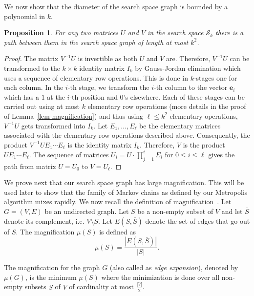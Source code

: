 \documentclass{sig-alternate-2013}
\newtheorem{proposition}[theorem]{Proposition}
\begin{document}
We now show that the diameter of the search space graph is bounded by
a polynomial in $k$.


\begin{proposition}\label{prop-path}
  For any two matrices $U$ and $V$ in the search space $\mathcal{S}_k$
  there is a path between them in the search space graph of length at
  most $k^2$.
\end{proposition}
\begin{proof}
  The matrix $V^{-1}U$ is invertible as both $U$ and $V$
  are. Therefore, $V^{-1}U$ can be transformed to the $k\times k$
  identity matrix $I_k$ by Gauss-Jordan elimination which uses a
  sequence of elementary row operations. This is done in $k$-stages
  one for each column. In the $i$-th stage, we transform the $i$-th
  column to the vector $\mathbf{e}_i$ which has a $1$ at the $i$-th
  position and $0$'s elsewhere. Each of these stages can be carried
  out using at most $k$ elementary row operations (more details in the
  proof of Lemma~\ref{lem-magnification}) and thus using $\ell \leq k^2$
  elementary operations, $V^{-1}U$ gets transformed into $I_k$. Let
  $E_1,\ldots, E_\ell$ be the elementary matrices associated with the
  elementary row operations described above. Consequently, the product
  $V^{-1}U E_1\cdots E_\ell$ is the identity matrix $I_k$. Therefore,
  $V$ is the product $UE_1\cdots E_\ell$.  The sequence of matrices
  $U_i = U \cdot \prod_{j=1}^i E_i$ for $0 \leq i \leq \ell$ gives the
  path from matrix $U = U_0$ to $V = U_\ell$.
\end{proof}

We prove next that our search space graph has large
magnification. This will be used later to show that the family of
Markov chains as defined by our Metropolis algorithm mixes rapidly. We
now recall the definition of magnification~\cite{alistair}. Let $G = (V,E)$
be an undirected graph. Let $S$ be a non-empty subset of $V$ and let
$\overline{S}$ denote its complement, i.e. $V \setminus S$.  Let
$E(S,\overline{S})$ denote the set of edges that go out of $S$. The
magnification $\mu(S)$ is defined as
\[
 \mu(S) = \frac{|E(S,\overline{S})|}{|S|}.
\]

The magnification for the graph $G$ (also called as \emph{edge
  expansion}), denoted by $\mu(G)$, is the minimum $\mu(S)$ where the
minimization is done over all non-empty subsets $S$ of $V$ of
cardinality at most $\frac{|V|}{2}$.
\end{document}
